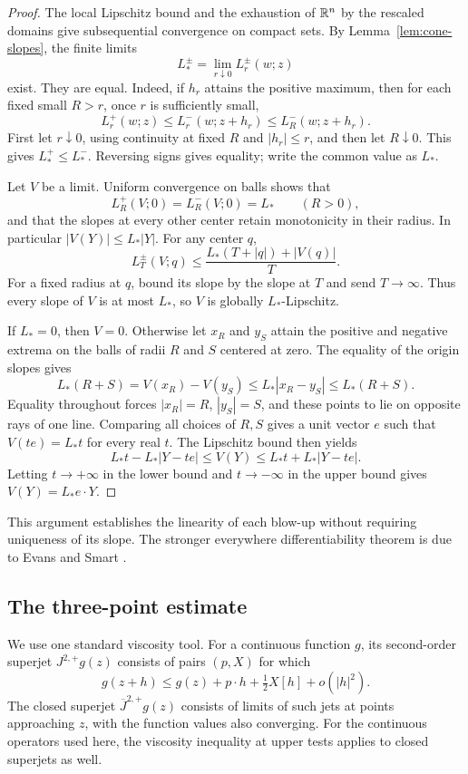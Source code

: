 \begin{proof}
The local Lipschitz bound and the exhaustion of $\mathbb{R}^n$ by the rescaled domains give subsequential convergence on compact sets. By Lemma~\ref{lem:cone-slopes}, the finite limits
\[
  L_*^\pm=\lim_{r\downarrow0}L_r^\pm(w;z)
\]
exist. They are equal. Indeed, if $h_r$ attains the positive maximum, then for each fixed small $R>r$, once $r$ is sufficiently small,
\[
  L_r^+(w;z)\le L_r^-(w;z+h_r)\le L_R^-(w;z+h_r).
\]
First let $r\downarrow0$, using continuity at fixed $R$ and $|h_r|\le r$, and then let $R\downarrow0$. This gives $L_*^+\le L_*^-$. Reversing signs gives equality; write the common value as $L_*$.

Let $V$ be a limit. Uniform convergence on balls shows that
\[
  L_R^+(V;0)=L_R^-(V;0)=L_*\qquad(R>0),
\]
and that the slopes at every other center retain monotonicity in their radius. In particular $|V(Y)|\le L_*|Y|$. For any center $q$,
\[
  L_T^\pm(V;q)\le\frac{L_*(T+|q|)+|V(q)|}{T}.
\]
For a fixed radius at $q$, bound its slope by the slope at $T$ and send $T\to\infty$. Thus every slope of $V$ is at most $L_*$, so $V$ is globally $L_*$-Lipschitz.

If $L_*=0$, then $V=0$. Otherwise let $x_R$ and $y_S$ attain the positive and negative extrema on the balls of radii $R$ and $S$ centered at zero. The equality of the origin slopes gives
\[
  L_*(R+S)=V(x_R)-V(y_S)
     \le L_*|x_R-y_S|\le L_*(R+S).
\]
Equality throughout forces $|x_R|=R$, $|y_S|=S$, and these points to lie on opposite rays of one line. Comparing all choices of $R,S$ gives a unit vector $e$ such that $V(te)=L_*t$ for every real $t$. The Lipschitz bound then yields
\[
  L_*t-L_*|Y-te|\le V(Y)\le L_*t+L_*|Y-te|.
\]
Letting $t\to+\infty$ in the lower bound and $t\to-\infty$ in the upper bound gives $V(Y)=L_*e\cdot Y$.
\end{proof}

This argument establishes the linearity of each blow-up without requiring uniqueness of its slope. The stronger everywhere differentiability theorem is due to Evans and Smart \cite{EvansSmart2011}.

\subsection{The three-point estimate}

We use one standard viscosity tool. For a continuous function $g$, its second-order superjet $J^{2,+}g(z)$ consists of pairs $(p,X)$ for which
\[
  g(z+h)\le g(z)+p\cdot h+\tfrac12X[h]+o(|h|^2).
\]
The closed superjet $\overline J^{2,+}g(z)$ consists of limits of such jets at points approaching $z$, with the function values also converging. For the continuous operators used here, the viscosity inequality at upper tests applies to closed superjets as well.


